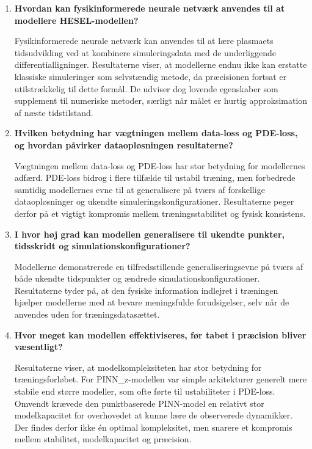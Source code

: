 \begin{enumerate}
\item \textbf{Hvordan kan fysikinformerede neurale netværk anvendes til at modellere HESEL-modellen?}

Fysikinformerede neurale netværk kan anvendes til at lære plasmaets tidsudvikling ved at kombinere simuleringsdata med de underliggende differentialligninger. Resultaterne viser, at modellerne endnu ikke kan erstatte klassiske simuleringer som selvstændig metode, da præcisionen fortsat er utilstrækkelig til dette formål. De udviser dog lovende egenskaber som supplement til numeriske metoder, særligt når målet er hurtig approksimation af næste tidstilstand.

\item \textbf{Hvilken betydning har vægtningen mellem data-loss og PDE-loss, og hvordan påvirker dataopløsningen resultaterne?}

Vægtningen mellem data-loss og PDE-loss har stor betydning for modellernes adfærd. PDE-loss bidrog i flere tilfælde til ustabil træning, men forbedrede samtidig modellernes evne til at generalisere på tværs af forskellige dataopløsninger og ukendte simuleringskonfigurationer. Resultaterne peger derfor på et vigtigt kompromis mellem træningsstabilitet og fysisk konsistens.

\item \textbf{I hvor høj grad kan modellen generalisere til ukendte punkter, tidsskridt og simulationskonfigurationer?}

Modellerne demonstrerede en tilfredsstillende generaliseringsevne på tværs af både ukendte tidspunkter og ændrede simulationskonfigurationer. Resultaterne tyder på, at den fysiske information indlejret i træningen hjælper modellerne med at bevare meningsfulde forudsigelser, selv når de anvendes uden for træningsdatasættet.

\item \textbf{Hvor meget kan modellen effektiviseres, før tabet i præcision bliver væsentligt?}

Resultaterne viser, at modelkompleksiteten har stor betydning for træningsforløbet. For PINN\_z-modellen var simple arkitekturer generelt mere stabile end større modeller, som ofte førte til ustabiliteter i PDE-loss. Omvendt krævede den punktbaserede PINN-model en relativt stor modelkapacitet for overhovedet at kunne lære de observerede dynamikker. Der findes derfor ikke én optimal kompleksitet, men snarere et kompromis mellem stabilitet, modelkapacitet og præcision.

\end{enumerate}

